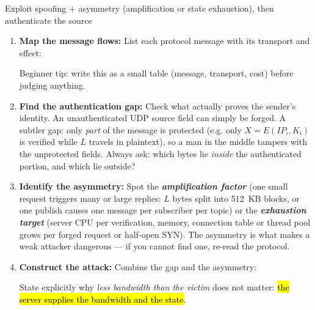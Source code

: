 \documentclass[12pt, a4paper]{article}
\newcommand{\term}[1]{\textbf{\textit{#1}}}        %
\newcommand{\imp}[1]{\hl{#1}}                       %
\begin{document}
\begin{schemebox}{Exploit spoofing + asymmetry (amplification or state exhaustion), then authenticate the source}
\begin{enumerate}[label=\textbf{Step \arabic*:}, leftmargin=*]
    \item \textbf{Map the message flows:} List each protocol message with its transport and effect:
    Beginner tip: write this as a small table (message, transport, cost) before judging anything.
    \item \textbf{Find the authentication gap:} Check what actually proves the sender's identity. An unauthenticated UDP source field can simply be forged. A subtler gap: only \emph{part} of the message is protected (e.g. only $X = E(IP_i, K_i)$ is verified while $L$ travels in plaintext), so a man in the middle tampers with the unprotected fields. Always ask: which bytes lie \emph{inside} the authenticated portion, and which lie outside?
    \item \textbf{Identify the asymmetry:} Spot the \term{amplification factor} (one small request triggers many or large replies: $L$ bytes split into 512~KB blocks, or one publish causes one message per subscriber per topic) or the \term{exhaustion target} (server CPU per verification, memory, connection table or thread pool grows per forged request or half-open SYN). The asymmetry is what makes a weak attacker dangerous --- if you cannot find one, re-read the protocol.
    \item \textbf{Construct the attack:} Combine the gap and the asymmetry:
    State explicitly why \emph{less bandwidth than the victim} does not matter: \imp{the server supplies the bandwidth and the state}.

\end{enumerate}
\end{schemebox}
\end{document}
